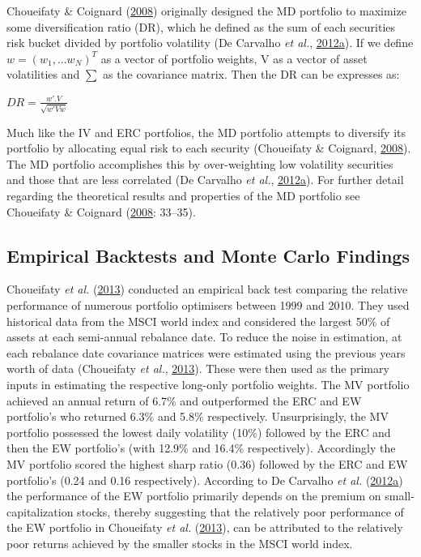 \documentclass[11pt,preprint, authoryear]{elsarticle}
\numberwithin{equation}{section}
\numberwithin{figure}{section}
\numberwithin{table}{section}
\begin{document}
Choueifaty \& Coignard (\protect\hyperlink{ref-choueifaty2008}{2008})
originally designed the MD portfolio to maximize some diversification
ratio (DR), which he defined as the sum of each securities risk bucket
divided by portfolio volatility (De Carvalho \emph{et al.},
\protect\hyperlink{ref-leote}{2012}\protect\hyperlink{ref-leote}{a}). If
we define \(w=(w_1,...w_N)^T\) as a vector of portfolio weights, V as a
vector of asset volatilities and \(\sum\) as the covariance matrix. Then
the DR can be expresses as:

\begin{center} 
$DR= \frac{w'.V}{\sqrt{w'Vw}}$ 
\end{center}

Much like the IV and ERC portfolios, the MD portfolio attempts to
diversify its portfolio by allocating equal risk to each security
(Choueifaty \& Coignard, \protect\hyperlink{ref-choueifaty2008}{2008}).
The MD portfolio accomplishes this by over-weighting low volatility
securities and those that are less correlated (De Carvalho \emph{et
al.},
\protect\hyperlink{ref-leote}{2012}\protect\hyperlink{ref-leote}{a}).
For further detail regarding the theoretical results and properties of
the MD portfolio see Choueifaty \& Coignard
(\protect\hyperlink{ref-choueifaty2008}{2008}: 33--35).

\hypertarget{empirical-backtests-and-monte-carlo-findings}{%
\subsection{Empirical Backtests and Monte Carlo
Findings}\label{empirical-backtests-and-monte-carlo-findings}}

Choueifaty \emph{et al.} (\protect\hyperlink{ref-choueifaty2013}{2013})
conducted an empirical back test comparing the relative performance of
numerous portfolio optimisers between 1999 and 2010. They used
historical data from the MSCI world index and considered the largest
50\% of assets at each semi-annual rebalance date. To reduce the noise
in estimation, at each rebalance date covariance matrices were estimated
using the previous years worth of data (Choueifaty \emph{et al.},
\protect\hyperlink{ref-choueifaty2013}{2013}). These were then used as
the primary inputs in estimating the respective long-only portfolio
weights. The MV portfolio achieved an annual return of 6.7\% and
outperformed the ERC and EW portfolio's who returned 6.3\% and 5.8\%
respectively. Unsurprisingly, the MV portfolio possessed the lowest
daily volatility (10\%) followed by the ERC and then the EW portfolio's
(with 12.9\% and 16.4\% respectively). Accordingly the MV portfolio
scored the highest sharp ratio (0.36) followed by the ERC and EW
portfolio's (0.24 and 0.16 respectively). According to De Carvalho
\emph{et al.}
(\protect\hyperlink{ref-leote}{2012}\protect\hyperlink{ref-leote}{a})
the performance of the EW portfolio primarily depends on the premium on
small-capitalization stocks, thereby suggesting that the relatively poor
performance of the EW portfolio in Choueifaty \emph{et al.}
(\protect\hyperlink{ref-choueifaty2013}{2013}), can be attributed to the
relatively poor returns achieved by the smaller stocks in the MSCI world
index.
\end{document}
